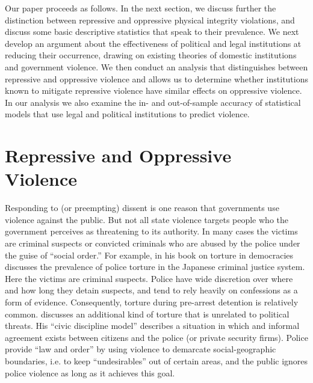 \documentclass[12pt]{article}
\begin{document}
Our paper proceeds as follows. In the next section, we discuss further the distinction between repressive and oppressive physical integrity violations, and discuss some basic descriptive statistics that speak to their prevalence. We next develop an argument about the effectiveness of political and legal institutions at reducing their occurrence, drawing on existing theories of domestic institutions and government violence. We then conduct an analysis that distinguishes between repressive and oppressive violence and allows us to determine whether institutions known to mitigate repressive violence have similar effects on oppressive violence. In our analysis we also examine the in- and out-of-sample accuracy of statistical models that use legal and political institutions to predict violence.    

\section*{Repressive and Oppressive Violence} 

Responding to (or preempting) dissent is one reason that governments use violence against the public. But not all state violence targets people who the government perceives as threatening to its authority. In many cases the victims are criminal suspects or convicted criminals who are abused by the police under the guise of ``social order.''  For example, in his book on torture in democracies \citep{Rejali2007} discusses the prevalence of police torture in the Japanese criminal justice system. Here the victims are criminal suspects. Police have wide discretion over where and how long they detain suspects, and tend to rely heavily on confessions as a form of evidence. Consequently, torture during pre-arrest detention is relatively common. \citep{Rejali2007} discusses an additional kind of torture that is unrelated to political threats. His ``civic discipline model'' describes a situation in which and informal agreement exists between citizens and the police (or private security firms). Police provide ``law and order'' by using violence to demarcate social-geographic boundaries, i.e. to keep ``undesirables'' out of certain areas, and the public ignores police violence as long as it achieves this goal. 
\end{document}
